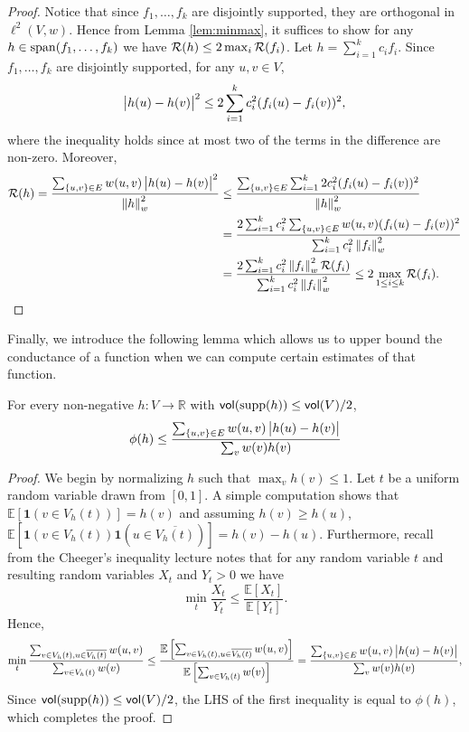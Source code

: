 \documentclass[11pt]{article}
\def\E{\mathbb{E}}
\newcommand{\vone}{\boldsymbol{\mathbf{1}}}
\begin{document}
\begin{proof}
Notice that since $f_1,\hdots,f_k$ are disjointly supported, they are orthogonal in $\ell^2(V,w)$. Hence from Lemma \ref{lem:minmax}, it suffices to show for any $h \in \operatorname{span}(f_1,\hdots,f_k)$ we have $\mathcal{R}(h) \leq 2\max_i \mathcal{R}(f_i)$. Let $h = \sum_{i=1}^{k}c_if_i$. Since $f_1,\hdots,f_k$ are disjointly supported, for any $u,v\in V$,
$$\left| h(u) - h(v) \right|^2 \leq 2\sum_{i=1}^{k}c_i^2(f_i(u) - f_i(v))^2,$$
where the inequality holds since at most two of the terms in the difference are non-zero. Moreover,
\begin{align*}
    \mathcal{R}(h) = \frac{\sum_{\{u,v\} \in E}w(u,v)\left| h(u) - h(v) \right|^2}{\left\lVert h \right\rVert_w^2} &\leq \frac{\sum_{\{u,v\} \in E}\sum_{i=1}^{k}2c_i^2(f_i(u) - f_i(v))^2}{\left\lVert h \right\rVert_w^2}\\
    &= \frac{2\sum_{i=1}^{k}c_i^2\sum_{\{u,v\} \in E}w(u,v)(f_i(u) - f_i(v))^2}{\sum_{i=1}^kc_i^2\left\lVert f_i \right\rVert_w^2}\\
    &= \frac{2\sum_{i=1}^kc_i^2\left\lVert f_i \right\rVert_w^2\mathcal{R}(f_i)}{\sum_{i=1}^{k}c_i^2\left\lVert f_i \right\rVert_w^2} \leq 2\max_{1\leq i\leq k}\mathcal{R}(f_i).
\end{align*}
\end{proof}
Finally, we introduce the following lemma which allows us to upper bound the conductance of a function when we can compute certain estimates of that function.
\begin{lemma} \label{lem_phi_h}
    For every non-negative $h : V \to \mathbb{R}$ with $\operatorname{\mathsf{vol}}(\mathrm{supp}({h})) \leq \operatorname{\mathsf{vol}}(V)/2$,
    \begin{equation}
        \phi(h) \leq \frac{\sum_{\{u,v\} \in E}{w(u,v)\left| h(u) - h(v) \right|}}{\sum_v w(v)h(v)}\label{eq:phi_h}
    \end{equation}
\end{lemma}
\begin{proof}
We begin by normalizing $h$ such that $\max_v h(v) \leq 1$. Let $t$ be a uniform random variable drawn from $[0,1]$. A simple computation shows that $\E[\vone(v \in V_h(t))] = h(v)$ and assuming $h(v) \geq h(u)$, $\E[\vone(v \in V_h(t))\vone(u \in \overline{V_h(t)})] = h(v) - h(u)$. Furthermore, recall from the Cheeger's inequality lecture notes that for any random variable $t$ and resulting random variables $X_t$ and $Y_t > 0$ we have
$$\min_t \frac{X_t}{Y_t} \leq \frac{\E[X_t]}{\E[Y_t]}.$$
Hence,
$$\min_t \frac{\sum_{v \in V_h(t),u \in \overline{V_h(t)}}w(u,v)}{\sum_{v \in V_h(t)}w(v)} \leq \frac{\E\left[\sum_{v \in V_h(t),u \in \overline{V_h(t)}}w(u,v)\right]}{\E\left[\sum_{v \in V_h(t)}w(v)\right]} = \frac{\sum_{\{u,v\} \in E}w(u,v)\abs{h(u) - h(v)}}{\sum_v w(v)h(v)},$$
Since $\operatorname{\mathsf{vol}}(\mathrm{supp}({h})) \leq \operatorname{\mathsf{vol}}(V)/2$, the LHS of the first inequality is equal to $\phi(h)$, which completes the proof.
\end{proof}
\end{document}
